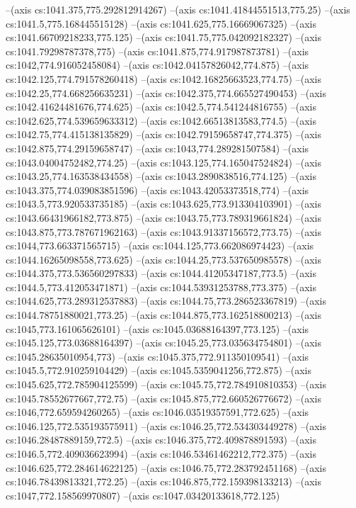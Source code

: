 --(axis cs:1041.375,775.292812914267)
--(axis cs:1041.41844551513,775.25)
--(axis cs:1041.5,775.168445515128)
--(axis cs:1041.625,775.16669067325)
--(axis cs:1041.66709218233,775.125)
--(axis cs:1041.75,775.042092182327)
--(axis cs:1041.79298787378,775)
--(axis cs:1041.875,774.917987873781)
--(axis cs:1042,774.916052458084)
--(axis cs:1042.04157826042,774.875)
--(axis cs:1042.125,774.791578260418)
--(axis cs:1042.16825663523,774.75)
--(axis cs:1042.25,774.668256635231)
--(axis cs:1042.375,774.665527490453)
--(axis cs:1042.41624481676,774.625)
--(axis cs:1042.5,774.541244816755)
--(axis cs:1042.625,774.539659633312)
--(axis cs:1042.66513813583,774.5)
--(axis cs:1042.75,774.415138135829)
--(axis cs:1042.79159658747,774.375)
--(axis cs:1042.875,774.29159658747)
--(axis cs:1043,774.289281507584)
--(axis cs:1043.04004752482,774.25)
--(axis cs:1043.125,774.165047524824)
--(axis cs:1043.25,774.163538434558)
--(axis cs:1043.2890838516,774.125)
--(axis cs:1043.375,774.039083851596)
--(axis cs:1043.42053373518,774)
--(axis cs:1043.5,773.920533735185)
--(axis cs:1043.625,773.913304103901)
--(axis cs:1043.66431966182,773.875)
--(axis cs:1043.75,773.789319661824)
--(axis cs:1043.875,773.787671962163)
--(axis cs:1043.91337156572,773.75)
--(axis cs:1044,773.663371565715)
--(axis cs:1044.125,773.662086974423)
--(axis cs:1044.16265098558,773.625)
--(axis cs:1044.25,773.537650985578)
--(axis cs:1044.375,773.536560297833)
--(axis cs:1044.41205347187,773.5)
--(axis cs:1044.5,773.412053471871)
--(axis cs:1044.53931253788,773.375)
--(axis cs:1044.625,773.289312537883)
--(axis cs:1044.75,773.286523367819)
--(axis cs:1044.78751880021,773.25)
--(axis cs:1044.875,773.162518800213)
--(axis cs:1045,773.161065626101)
--(axis cs:1045.03688164397,773.125)
--(axis cs:1045.125,773.03688164397)
--(axis cs:1045.25,773.035634754801)
--(axis cs:1045.28635010954,773)
--(axis cs:1045.375,772.911350109541)
--(axis cs:1045.5,772.910259104429)
--(axis cs:1045.5359041256,772.875)
--(axis cs:1045.625,772.785904125599)
--(axis cs:1045.75,772.784910810353)
--(axis cs:1045.78552677667,772.75)
--(axis cs:1045.875,772.660526776672)
--(axis cs:1046,772.659594260265)
--(axis cs:1046.03519357591,772.625)
--(axis cs:1046.125,772.535193575911)
--(axis cs:1046.25,772.534303449278)
--(axis cs:1046.28487889159,772.5)
--(axis cs:1046.375,772.409878891593)
--(axis cs:1046.5,772.409036623994)
--(axis cs:1046.53461462212,772.375)
--(axis cs:1046.625,772.284614622125)
--(axis cs:1046.75,772.283792451168)
--(axis cs:1046.78439813321,772.25)
--(axis cs:1046.875,772.159398133213)
--(axis cs:1047,772.158569970807)
--(axis cs:1047.03420133618,772.125)
